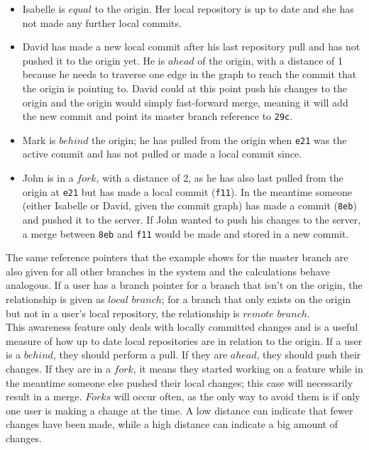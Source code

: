 \begin{itemize}


\item Isabelle is $equal$ to the origin. Her local repository is up to date and she has not made any further local commits.
\item David has made a new local commit after his last repository pull and has not pushed it to the origin yet. He is $ahead$ of the origin, with a distance of 1 because he needs to traverse one edge in the graph to reach the commit that the origin is pointing to. David could at this point push his changes to the origin and the origin would simply fast-forward merge, meaning it will add the new commit and point its master branch reference to \texttt{29c}.
\item Mark is $behind$ the origin; he has pulled from the origin when \texttt{e21} was the active commit and has not pulled or made a local commit since.
\item John is in a $fork$, with a distance of 2, as he has also last pulled from the origin at \texttt{e21} but has made a local commit (\texttt{f11}). In the meantime someone (either Isabelle or David, given the commit graph) has made a commit (\texttt{8eb}) and pushed it to the server. If John wanted to push his changes to the server, a merge between \texttt{8eb} and \texttt{f11} would be made and stored in a new commit.

\end{itemize}


The same reference pointers that the example shows for the master branch are also given for all other branches in the system and the calculations behave analogous. If a user has a branch pointer for a branch that isn't on the origin, the relationship is given as $local$ $branch$; for a branch that only exists on the origin but not in a user's local repository, the relationship is $remote$ $branch$. \\

This awareness feature only deals with locally committed changes and is a useful measure of how up to date local repositories are in relation to the origin. If a user is a $behind$, they should perform a pull. If they are $ahead$, they should push their changes. If they are in a $fork$, it means they started working on a feature while in the meantime someone else pushed their local changes; this case will necessarily result in a merge. $Forks$ will occur often, as the only way to avoid them is if only one user is making a change at the time. A low distance can indicate that fewer changes have been made, while a high distance can indicate a big amount of changes. \\

